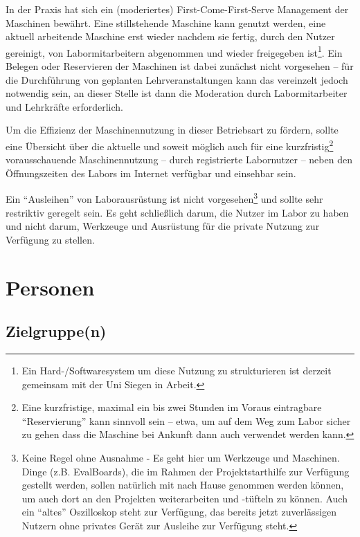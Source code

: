 \documentclass[parskip=half,headsepline,footsepline,titlepage]{scrartcl}
\begin{document}
In der Praxis hat sich ein (moderiertes) First-Come-First-Serve Management der Maschinen bewährt. Eine stillstehende Maschine kann genutzt werden, eine aktuell arbeitende Maschine erst wieder nachdem sie fertig, durch den Nutzer gereinigt, von Labormitarbeitern abgenommen und wieder freigegeben ist\footnote{Ein Hard-/Softwaresystem um diese Nutzung zu strukturieren ist derzeit gemeinsam mit der Uni Siegen in Arbeit.}. Ein Belegen oder Reservieren der Maschinen ist dabei zunächst nicht vorgesehen -- für die Durchführung von geplanten Lehrveranstaltungen kann das vereinzelt jedoch notwendig sein, an dieser Stelle ist dann die Moderation durch Labormitarbeiter und Lehrkräfte erforderlich.

Um die Effizienz der Maschinennutzung in dieser Betriebsart zu fördern, sollte eine Übersicht über die aktuelle und soweit möglich auch für eine kurzfristig\footnote{Eine kurzfristige, maximal ein bis zwei Stunden im Voraus eintragbare ``Reservierung'' kann sinnvoll sein -- etwa, um auf dem Weg zum Labor sicher zu gehen dass die Maschine bei Ankunft dann auch verwendet werden kann.} vorausschauende Maschinennutzung -- durch registrierte Labornutzer -- neben den Öffnungszeiten des Labors im Internet verfügbar und einsehbar sein.

Ein ``Ausleihen'' von Laborausrüstung ist nicht vorgesehen\footnote{Keine Regel ohne Ausnahme - Es geht hier um Werkzeuge und Maschinen. Dinge (z.B. EvalBoards), die im Rahmen der Projektstarthilfe zur Verfügung gestellt werden, sollen natürlich mit nach Hause genommen werden können, um auch dort an den Projekten weiterarbeiten und -tüfteln zu können. Auch ein ``altes'' Oszilloskop steht zur Verfügung, das bereits jetzt zuverlässigen Nutzern ohne privates Gerät zur Ausleihe zur Verfügung steht.} und sollte sehr restriktiv geregelt sein. Es geht schließlich darum, die Nutzer im Labor zu haben und nicht darum, Werkzeuge und Ausrüstung für die private Nutzung zur Verfügung zu stellen.



\section{Personen}

\subsection{Zielgruppe(n)}
\end{document}
